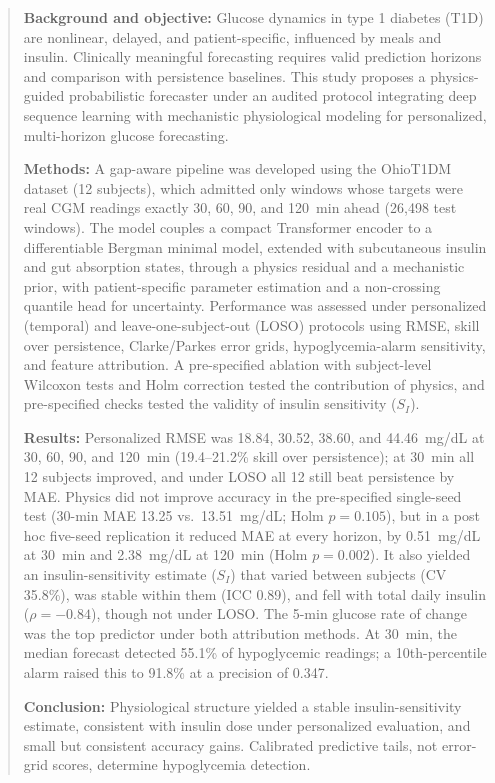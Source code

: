 \documentclass[journal]{IEEEtran}
\begin{document}
\begin{abstract}
\textbf{Background and objective:} Glucose dynamics in type 1 diabetes (T1D) are nonlinear, delayed, and patient-specific, influenced by meals and insulin. Clinically meaningful forecasting requires valid prediction horizons and comparison with persistence baselines. This study proposes a physics-guided probabilistic forecaster under an audited protocol integrating deep sequence learning with mechanistic physiological modeling for personalized, multi-horizon glucose forecasting.

\textbf{Methods:} A gap-aware pipeline was developed using the OhioT1DM dataset (12 subjects), which admitted only windows whose targets were real CGM readings exactly 30, 60, 90, and 120~min ahead (26,498 test windows). The model couples a compact Transformer encoder to a differentiable Bergman minimal model, extended with subcutaneous insulin and gut absorption states, through a physics residual and a mechanistic prior, with patient-specific parameter estimation and a non-crossing quantile head for uncertainty. Performance was assessed under personalized (temporal) and leave-one-subject-out (LOSO) protocols using RMSE, skill over persistence, Clarke/Parkes error grids, hypoglycemia-alarm sensitivity, and feature attribution. A pre-specified ablation with subject-level Wilcoxon tests and Holm correction tested the contribution of physics, and pre-specified checks tested the validity of insulin sensitivity ($S_I$).

\textbf{Results:} Personalized RMSE was 18.84, 30.52, 38.60, and 44.46~mg/dL at 30, 60, 90, and 120~min (19.4--21.2\% skill over persistence); at 30~min all 12 subjects improved, and under LOSO all 12 still beat persistence by MAE. Physics did not improve accuracy in the pre-specified single-seed test (30-min MAE 13.25 vs.\ 13.51~mg/dL; Holm $p=0.105$), but in a post hoc five-seed replication it reduced MAE at every horizon, by 0.51~mg/dL at 30~min and 2.38~mg/dL at 120~min (Holm $p=0.002$). It also yielded an insulin-sensitivity estimate ($S_I$) that varied between subjects (CV 35.8\%), was stable within them (ICC 0.89), and fell with total daily insulin ($\rho=-0.84$), though not under LOSO\@. The 5-min glucose rate of change was the top predictor under both attribution methods. At 30~min, the median forecast detected 55.1\% of hypoglycemic readings; a 10th-percentile alarm raised this to 91.8\% at a precision of 0.347.

\textbf{Conclusion:} Physiological structure yielded a stable insulin-sensitivity estimate, consistent with insulin dose under personalized evaluation, and small but consistent accuracy gains. Calibrated predictive tails, not error-grid scores, determine hypoglycemia detection.
\end{abstract}
\end{document}
